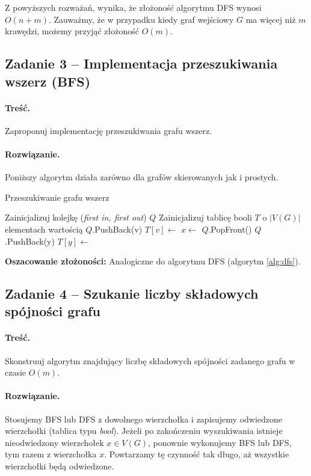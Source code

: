 Z powyższych rozważań, wynika, że złożoność algorytmu DFS wynosi $O(n + m)$. Zauważmy, że
w przypadku kiedy graf wejściowy $G$ ma więcej niż $m$ krawędzi, możemy przyjąć złożoność $O(m)$.

\subsection{Zadanie 3 -- Implementacja przeszukiwania wszerz (BFS)}
\label{zad:bfs}
\paragraph{Treść.} Zaproponuj implementację
przeszukiwania grafu wszerz.

\paragraph{Rozwiązanie.}
Poniższy algorytm działa zarówno dla grafów skierowanych
jak i prostych.

\begin{algorithm}[H]
	\caption{Przeszukiwanie grafu wszerz}\label{Zadanie23}
	\begin{algorithmic}[1]
		\State Zainicjalizuj kolejkę (\textit{first in, first out}) $Q$
		\State Zainicjalizuj tablicę booli $T$ o $|V(G)|$ elementach wartością 
		\false
		\State $Q$.PushBack(v)
		\State $T[v] \gets$ \false
		\State $x \gets$ $Q$.PopFront()
		\State $Q$.PushBack(y)
		\State $T[y] \gets$ \true
		\EndIf
		\EndWhile
		\EndWhile
		\EndProcedure
	\end{algorithmic}
\end{algorithm}

\textbf{Oszacowanie złożoności:} Analogiczne do algorytmu DFS (algorytm \ref{alg:dfs}).

\subsection{Zadanie 4 -- Szukanie liczby składowych spójności grafu}

\paragraph{Treść.} Skonstruuj algorytm znajdujący liczbę składowych 
spójności zadanego grafu w czasie $O(m)$.

\paragraph{Rozwiązanie.} Stosujemy BFS lub DFS z dowolnego 
wierzchołka i zapisujemy odwiedzone wierzchołki (tablica typu \textit{bool}).
Jeżeli po zakończeniu wyszukiwania istnieje nieodwiedzony wierzchołek $x \in V(G)$,
 ponownie wykonujemy BFS lub DFS, tym razem z wierzchołka $x$.
Powtarzamy tę czynność tak długo, aż wszystkie wierzchołki będą odwiedzone. 


